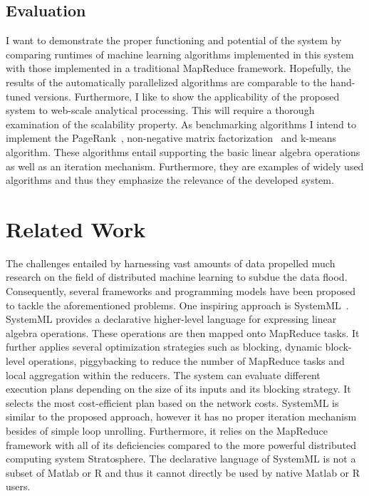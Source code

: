 \documentclass{dima}
\begin{document}
\subsection{Evaluation}

I want to demonstrate the proper functioning and potential of the system by comparing runtimes of machine learning algorithms implemented in this system with those implemented in a traditional MapReduce framework.
Hopefully, the results of the automatically parallelized algorithms are comparable to the hand-tuned versions.
Furthermore, I like to show the applicability of the proposed system to web-scale analytical processing.
This will require a thorough examination of the scalability property.
As benchmarking algorithms I intend to implement the PageRank~\cite{page:1999a}, non-negative matrix factorization~\cite{seung:anips2001a} and k-means~\cite{macqueen:1967a} algorithm.
These algorithms entail supporting the basic linear algebra operations as well as an iteration mechanism.
Furthermore, they are examples of widely used algorithms and thus they emphasize the relevance of the developed system.

\section{Related Work}

The challenges entailed by harnessing vast amounts of data propelled much research on the field of distributed machine learning to subdue the data flood.
Consequently, several frameworks and programming models have been proposed to tackle the aforementioned problems.
One inspiring approach is SystemML~\cite{ghoting:2011a}.
SystemML provides a declarative higher-level language for expressing linear algebra operations.
These operations are then mapped onto MapReduce tasks.
It further applies several optimization strategies such as blocking, dynamic block-level operations, piggybacking to reduce the number of MapReduce tasks and local aggregation within the reducers.
The system can evaluate different execution plans depending on the size of its inputs and its blocking strategy.
It selects the most cost-efficient plan based on the network costs.
SystemML is similar to the proposed approach, however it has no proper iteration mechanism besides of simple loop unrolling.
Furthermore, it relies on the MapReduce framework with all of its deficiencies compared to the more powerful distributed computing system Stratosphere.
The declarative language of SystemML is not a subset of Matlab or R and thus it cannot directly be used by native Matlab or R users.
\end{document}
